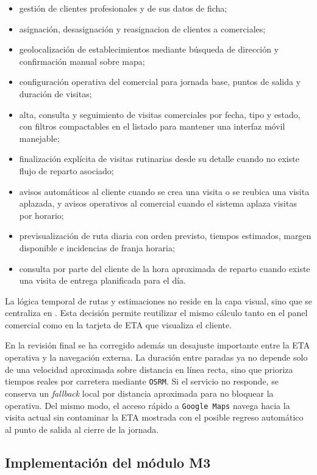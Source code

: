 \begin{itemize}
    \item gestión de clientes profesionales y de sus datos de ficha;
    \item asignación, desasignación y reasignacion de clientes a comerciales;
    \item geolocalización de establecimientos mediante búsqueda de dirección y confirmación manual sobre mapa;
    \item configuración operativa del comercial para jornada base, puntos de salida y duración de visitas;
    \item alta, consulta y seguimiento de visitas comerciales por fecha, tipo y estado, con filtros compactables en el listado para mantener una interfaz móvil manejable;
    \item finalización explícita de visitas rutinarias desde su detalle cuando no existe flujo de reparto asociado;
    \item avisos automáticos al cliente cuando se crea una visita o se reubica una visita aplazada, y avisos operativos al comercial cuando el sistema aplaza visitas por horario;
    \item previsualización de ruta diaria con orden previsto, tiempos estimados, margen disponible e incidencias de franja horaria;
    \item consulta por parte del cliente de la hora aproximada de reparto cuando existe una visita de entrega planificada para el día.
\end{itemize}

La lógica temporal de rutas y estimaciones no reside en la capa visual, sino que se centraliza en . Esta decisión permite reutilizar el mismo cálculo tanto en el panel comercial como en la tarjeta de ETA que visualiza el cliente.

En la revisión final se ha corregido además un desajuste importante entre la ETA operativa y la navegación externa. La duración entre paradas ya no depende solo de una velocidad aproximada sobre distancia en línea recta, sino que prioriza tiempos reales por carretera mediante \texttt{OSRM}. Si el servicio no responde, se conserva un \textit{fallback} local por distancia aproximada para no bloquear la operativa. Del mismo modo, el acceso rápido a \texttt{Google Maps} navega hacia la visita actual sin contaminar la ETA mostrada con el posible regreso automático al punto de salida al cierre de la jornada.

\subsection{Implementación del módulo M3}

